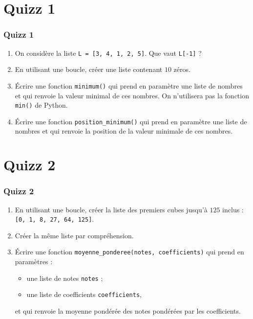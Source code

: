 \documentclass{beamer}
\begin{document}
\section{Quizz 1}

\begin{frame}
  \frametitle{Quizz 1}
  \begin{enumerate}
    \item On considère la liste \texttt{L = [3, 4, 1, 2, 5]}. Que vaut \texttt{L[-1]} ?
    \item En utilisant une boucle, créer une liste contenant $10$ zéros.
    \item Écrire une fonction \texttt{minimum()} qui prend en paramètre une liste de nombres et qui renvoie la valeur minimal de ces nombres. On n'utilisera pas la fonction \texttt{min()} de Python.
    \item Écrire une fonction \texttt{position_minimum()} qui prend en paramètre une liste de nombres et qui renvoie la position de la valeur minimale de ces nombres.
  \end{enumerate}
\end{frame}

\section{Quizz 2}

\begin{frame}
  \frametitle{Quizz 2}
  \begin{enumerate}
    \item En utilisant une boucle, créer la liste des premiers cubes jusqu'à $125$ inclus : \texttt{[0, 1, 8, 27, 64, 125]}.\pause{}
    \item Créer la même liste par compréhension.\pause{}
    \item Écrire une fonction \texttt{moyenne_ponderee(notes, coefficients)} qui prend en paramètres :
      \begin{itemize}
	\item une liste de notes \texttt{notes} ;
	\item une liste de coefficients \texttt{coefficients},
      \end{itemize}
      et qui renvoie la moyenne pondérée des notes pondérées par les coefficients.
  \end{enumerate}
\end{frame}
\end{document}
